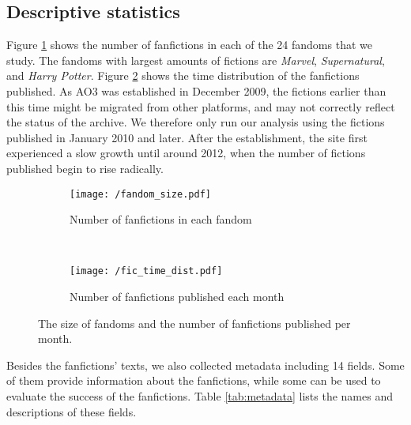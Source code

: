 \documentclass[a4paper]{article}
\begin{document}
\subsection*{Descriptive statistics}

Figure \ref{fig:fandom_size} shows the number of fanfictions in each of the 24 fandoms that we study. The fandoms with largest amounts of fictions are \emph{Marvel}, \emph{Supernatural}, and \emph{Harry Potter}. Figure \ref{fig:fic_time_dist}  shows the time distribution of the fanfictions published. As AO3 was established in December 2009, the fictions earlier than this time might be migrated from other platforms, and may not correctly reflect the status of the archive. We therefore only run our analysis using the fictions published in January 2010 and later. After the establishment, the site first experienced a slow growth until around 2012, when the number of fictions published begin to rise radically. 

\begin{figure}
    \centering
    \begin{subfigure}[b]{\textwidth}
        \texttt{[image: /fandom\_size.pdf]}
        \caption{Number of fanfictions in each fandom}
        \label{fig:fandom_size}
    \end{subfigure}
    ~ %
    \begin{subfigure}[b]{0.8\textwidth}
        \texttt{[image: /fic\_time\_dist.pdf]}
        \caption{Number of fanfictions published each month}
        \label{fig:fic_time_dist}
    \end{subfigure}
    \caption{The size of fandoms and the number of fanfictions published per month.}\label{fig:stats_size_time}
\end{figure}

Besides the fanfictions' texts, we also collected metadata including 14 fields. Some of them provide information about the fanfictions, while some can be used to evaluate the success of the fanfictions. Table \ref{tab:metadata} lists the names and descriptions of these fields. 
\end{document}
